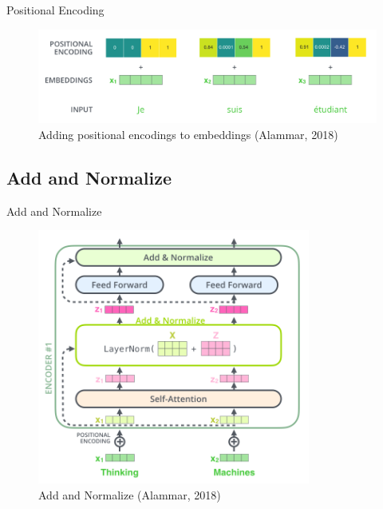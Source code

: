 \documentclass[10pt]{beamer}
\begin{document}
\begin{frame}{Positional Encoding}

\begin{figure}[h]
\centering
\includegraphics[width=1\textwidth]{fig/alammar_transformer_positional_encoding_example.png}
\caption{Adding positional encodings to embeddings (Alammar, 2018)}
\end{figure}

\end{frame}

\subsection{Add and Normalize}

\begin{frame}{Add and Normalize}

\begin{figure}[h]
\centering
\includegraphics[width=0.8\textwidth]{fig/alammar_transformer_resideual_layer_norm_2.png}
\caption{Add and Normalize (Alammar, 2018)}
\end{figure}

\end{frame}
\end{document}
